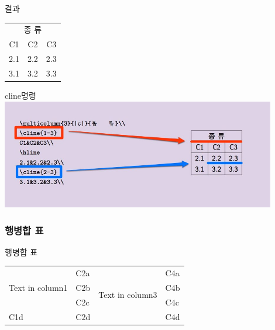 \documentclass{beamer}
\begin{document}
\begin{frame}
\begin{block}{결과}
\begin{table}[!h]
\begin{center}
\begin{tabular}{|c|c|c|}
\hline
\multicolumn{3}{|c|}{종   류}\\
\cline{1-3}
C1&C2&C3\\
\hline
2.1&2.2&2.3\\
\cline{2-3}
3.1&3.2&3.3\\
\hline
\end{tabular}
\end{center}
\end{table}
\end{block}
\end{frame}

\begin{frame}
\begin{block}{cline명령}
\includegraphics[width=0.9\textwidth]{table2-001}
\end{block}
\end{frame}




\subsubsection{행병합 표}


\begin{frame}
\begin{block}{행병합 표}
\begin{table}[!h]
\begin{center}
\begin{tabular}{|l|l|l|l|}\hline
\multirow{3}{20mm}{Text in column1}&C2a&\multirow{4}{20mm}{Text in column3}&C4a\\
	&	C2b	&	&	C4b\\
	&	C2c	&	&	C4c\\
\cline{1-2}
C1d	&	C2d	&	&	C4d\\
\hline
\end{tabular}
\end{center}
\end{table}
\end{block}
\end{frame}
\end{document}
